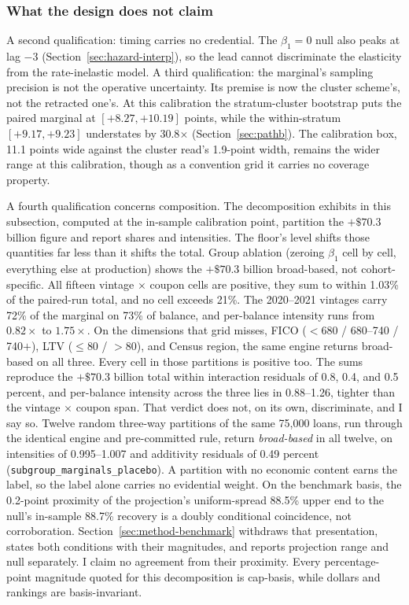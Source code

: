 \documentclass[12pt]{article}
\begin{document}
\subsubsection{What the design does not claim}

A second qualification: timing carries no credential. The $\beta_1 = 0$ null also peaks at lag $-3$ (Section~\ref{sec:hazard-interp}), so the lead cannot discriminate the elasticity from the rate-inelastic model. A third qualification: the marginal's sampling precision is not the operative uncertainty. Its premise is now the cluster scheme's, not the retracted one's. At this calibration the stratum-cluster bootstrap puts the paired marginal at $[+8.27, +10.19]$ points, while the within-stratum $[+9.17, +9.23]$ understates by 30.8$\times$ (Section~\ref{sec:pathb}). The calibration box, 11.1 points wide against the cluster read's 1.9-point width, remains the wider range at this calibration, though as a convention grid it carries no coverage property.

A fourth qualification concerns composition. The decomposition exhibits in this subsection, computed at the in-sample calibration point, partition the $+\$70.3$ billion figure and report shares and intensities. The floor's level shifts those quantities far less than it shifts the total. Group ablation (zeroing $\beta_1$ cell by cell, everything else at production) shows the $+\$70.3$ billion broad-based, not cohort-specific. All fifteen vintage $\times$ coupon cells are positive, they sum to within 1.03\% of the paired-run total, and no cell exceeds 21\%. The 2020--2021 vintages carry 72\% of the marginal on 73\% of balance, and per-balance intensity runs from $0.82\times$ to $1.75\times$. On the dimensions that grid misses, FICO ($<$680 / 680--740 / 740$+$), LTV ($\leq$80 / $>$80), and Census region, the same engine returns broad-based on all three. Every cell in those partitions is positive too. The sums reproduce the $+\$70.3$ billion total within interaction residuals of 0.8, 0.4, and 0.5 percent, and per-balance intensity across the three lies in 0.88--1.26, tighter than the vintage $\times$ coupon span. That verdict does not, on its own, discriminate, and I say so. Twelve random three-way partitions of the same 75,000 loans, run through the identical engine and pre-committed rule, return \emph{broad-based} in all twelve, on intensities of 0.995--1.007 and additivity residuals of 0.49 percent (\texttt{subgroup\_marginals\_placebo}). A partition with no economic content earns the label, so the label alone carries no evidential weight. On the benchmark basis, the 0.2-point proximity of the projection's uniform-spread 88.5\% upper end to the null's in-sample 88.7\% recovery is a doubly conditional coincidence, not corroboration. Section~\ref{sec:method-benchmark} withdraws that presentation, states both conditions with their magnitudes, and reports projection range and null separately. I claim no agreement from their proximity. Every percentage-point magnitude quoted for this decomposition is cap-basis, while dollars and rankings are basis-invariant.
\end{document}
